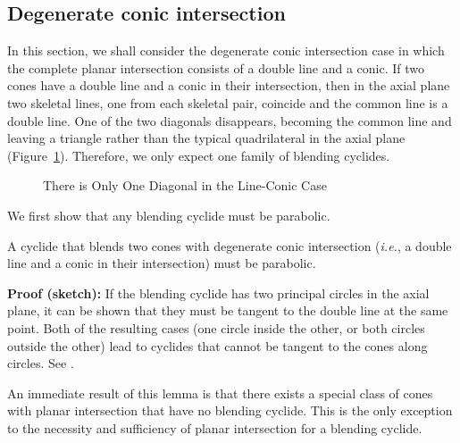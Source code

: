\subsection{Degenerate conic intersection}
\label{section:line-conic}

     In this section, we shall consider the degenerate conic intersection
case in which the 
complete planar intersection consists of a double line and a conic. 
If two cones have a double line and a conic in their intersection, then
in the axial plane two skeletal lines, one from each skeletal pair, coincide 
and the common line is a double line.  
One of the two diagonals disappears, 
becoming the common line and leaving a triangle rather than the typical
quadrilateral in the axial plane (Figure~\ref{fig:three-lines}).
Therefore, we only expect one family of blending cyclides.

\begin{figure}
\vspace{7.5cm}
\caption{There is Only One Diagonal in the Line-Conic Case}
\label{fig:three-lines}
\end{figure}

We first show that any blending cyclide must be parabolic.

\begin{lemma}
\label{lemma:only-one-family}
     A cyclide that blends two cones with degenerate conic
intersection ({\em i.e.}, a double line and a conic in their 
intersection) must be parabolic.
\end{lemma}
{\bf Proof (sketch):} 
If the blending cyclide has two principal circles in the axial plane,
it can be shown that they must be tangent to the double line at the same point.
Both of the resulting cases (one circle inside the other, or both circles
outside the other) lead to cyclides that 
cannot be tangent to the cones along circles.
See \cite[Lemma~5.17]{shenethesis}.
\QED

An immediate result of this lemma is that there exists a special
class of cones with planar intersection that have no blending cyclide.  This
is the only exception to the necessity and sufficiency of planar intersection
for a blending cyclide.

